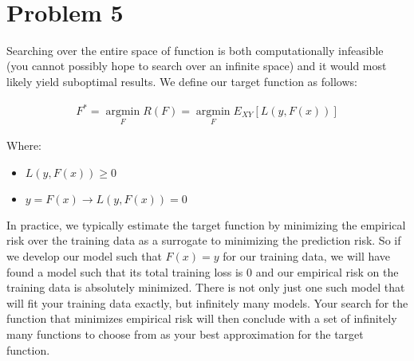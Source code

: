 \documentclass[11pt]{article}
\DeclareMathOperator*{\argmin}{argmin}
\newcommand*{\argminl}{\argmin\limits}
\begin{document}
\begin{center}

\ \\
\end{center}


\section*{Problem 5}

\vspace{5 mm} 
\noindent 
Searching over the entire space of function is both computationally infeasible 
(you cannot possibly hope to search over an infinite space) and it would most 
likely yield suboptimal results. We define our target function as follows:

\begin{gather*}
F^{*} = \argminl_{F} R(F) = \argminl_{F} E_{XY}[L(y, F(x))]
\end{gather*}

\noindent
Where:

\begin{itemize}
\item $L(y, F(x)) \ge 0$
\item $y = F(x) \rightarrow L(y, F(x)) = 0$
\end{itemize}

\noindent
In practice, we typically estimate the target function by minimizing the
empirical risk over the training data as a surrogate to minimizing the
prediction risk. So if we develop our model such that $F(x) = y$ for our
training data, we will have found a model such that its total training loss is
$0$ and our empirical risk on the training data is absolutely minimized. There 
is not only just one such model that will fit your training data exactly, but
infinitely many models. Your search for the function that minimizes empirical
risk will then conclude with a set of infinitely many functions to choose from
as your best approximation for the target function.
\end{document}
